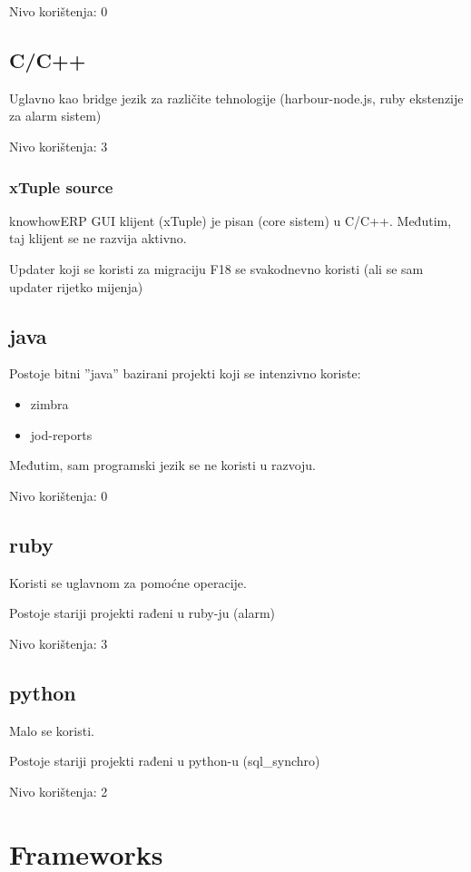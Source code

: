 \documentclass[times, utf8, seminar]{fit}
\begin{document}
Nivo korištenja: 0

\section{C/C++}

Uglavno kao bridge jezik za različite tehnologije (harbour-node.js, ruby ekstenzije za alarm sistem)

Nivo korištenja: 3

\subsection{xTuple source}

knowhowERP GUI klijent (xTuple) je pisan (core sistem) u C/C++. Međutim, taj klijent se ne razvija aktivno.

Updater koji se koristi za migraciju F18 se svakodnevno koristi (ali se sam updater rijetko mijenja)

\section{java}

Postoje bitni ''java'' bazirani projekti koji se intenzivno koriste:
\begin{itemize}
 \item zimbra
 \item jod-reports
\end{itemize}

Međutim, sam programski jezik se ne koristi u razvoju.

Nivo korištenja: 0

\section{ruby}

Koristi se uglavnom za pomoćne operacije. 

Postoje stariji projekti rađeni u ruby-ju (alarm)

Nivo korištenja: 3

\section{python}

Malo se koristi. 

Postoje stariji projekti rađeni u python-u (sql\_synchro)

Nivo korištenja: 2

\chapter{Frameworks}
\end{document}
